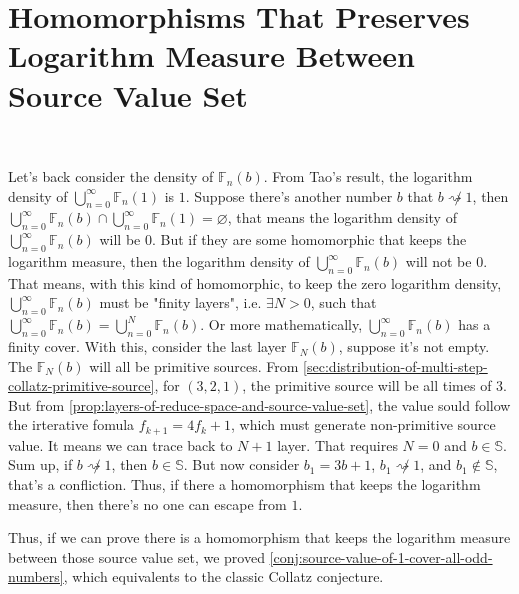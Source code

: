 \section{Homomorphisms That Preserves Logarithm Measure Between Source Value Set}~\label{sec:homomorphisms-that-preserves-logarithm-measure-between-source-value-set}

Let's back consider the density of $\mathbb{F}_{n}(b)$.
From Tao's result\cite{tao2022orbitscollatzmapattain}, the logarithm density of $\bigcup_{n=0}^{\infty}\mathbb{F}_{n}(1)$ is $1$.
Suppose there's another number $b$ that $b \not\rightsquigarrow 1$, then $\bigcup_{n=0}^{\infty}\mathbb{F}_{n}(b)\cap\bigcup_{n=0}^{\infty}\mathbb{F}_{n}(1) = \varnothing$, that means the logarithm density of $\bigcup_{n=0}^{\infty}\mathbb{F}_{n}(b)$ will be $0$.
But if they are some homomorphic that keeps the logarithm measure, then the logarithm density of $\bigcup_{n=0}^{\infty}\mathbb{F}_{n}(b)$ will not be $0$.
That means, with this kind of homomorphic, to keep the zero logarithm density, $\bigcup_{n=0}^{\infty}\mathbb{F}_{n}(b)$ must be "finity layers", i.e. $\exists N > 0$, such that $\bigcup_{n=0}^{\infty}\mathbb{F}_{n}(b) = \bigcup_{n=0}^{N}\mathbb{F}_{n}(b)$.
Or more mathematically, $\bigcup_{n=0}^{\infty}\mathbb{F}_{n}(b)$ has a finity cover.
With this, consider the last layer $\mathbb{F}_{N}(b)$, suppose it's not empty.
The $\mathbb{F}_{N}(b)$ will all be primitive sources.
From \cref{sec:distribution-of-multi-step-collatz-primitive-source}, for $(3,2,1)$, the primitive source will be all times of $3$.
But from \cref{prop:layers-of-reduce-space-and-source-value-set}, the value sould follow the irterative fomula $f_{k+1} = 4f_{k} + 1$, which must generate non-primitive source value. It means we can trace back to $N+1$ layer.
That requires $N = 0$ and $b \in \mathbb{S}$. Sum up, if $b \not\rightsquigarrow 1$, then $b \in \mathbb{S}$.
But now consider $b_1 = 3b + 1$, $b_1 \not\rightsquigarrow 1$, and $b_1 \not \in \mathbb{S}$, that's a confliction.
Thus, if there a homomorphism that keeps the logarithm measure, then there's no one can escape from $1$.

Thus, if we can prove there is a homomorphism that keeps the logarithm measure between those source value set, we proved \cref{conj:source-value-of-1-cover-all-odd-numbers}, which equivalents to the classic Collatz conjecture.
